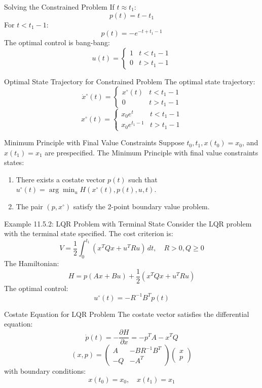 \documentclass[10pt]{beamer}
\begin{document}
\begin{frame}[fragile]{Solving the Constrained Problem}
  If \( t \approx t_1 \):
  \[
  p(t) = t - t_1
  \]
  For \( t < t_1 - 1 \):
  \[
  p(t) = -e^{-t + t_1 - 1}
  \]
  The optimal control is bang-bang:
  \[
  u(t) = \begin{cases}
  1 & t < t_1 - 1 \\
  0 & t > t_1 - 1
  \end{cases}
  \]
\end{frame}
  
\begin{frame}[fragile]{Optimal State Trajectory for Constrained Problem}
  The optimal state trajectory:
  \[
  \dot{x}^\circ(t) = \begin{cases}
  x^\circ(t) & t < t_1 - 1 \\
  0 & t > t_1 - 1
  \end{cases}
  \]
  \[
  x^\circ(t) = \begin{cases}
  x_0 e^t & t < t_1 - 1 \\
  x_0 e^{t_1 - 1} & t > t_1 - 1
  \end{cases}
  \]
\end{frame}
  
\begin{frame}[fragile]{Minimum Principle with Final Value Constraints}
  Suppose \( t_0, t_1, x(t_0) = x_0 \), and \( x(t_1) = x_1 \) are prespecified. The Minimum Principle with final value constraints states:
  \begin{enumerate}
      \item There exists a costate vector \( p(t) \) such that \( u^\circ(t) = \arg \min_u H(x^\circ(t), p(t), u, t) \).
      \item The pair \( (p, x^\circ) \) satisfy the 2-point boundary value problem.
  \end{enumerate}
\end{frame}
  
\begin{frame}[fragile]{Example 11.5.2: LQR Problem with Terminal State}
  Consider the LQR problem with the terminal state specified. The cost criterion is:
  \[
  V = \frac{1}{2} \int_0^{t_1} (x^T Q x + u^T R u) \, dt, \quad R > 0, Q \ge 0
  \]
  The Hamiltonian:
  \[
  H = p (A x + B u) + \frac{1}{2} (x^T Q x + u^T R u)
  \]
  The optimal control:
  \[
  u^\circ(t) = -R^{-1} B^T p(t)
  \]
\end{frame}
  
\begin{frame}[fragile]{Costate Equation for LQR Problem}
  The costate vector satisfies the differential equation:
  \[
  \dot{p}(t) = -\frac{\partial H}{\partial x} = -p^T A - x^T Q
  \]
  \[
  (x, p) = \begin{pmatrix}
  A & -BR^{-1}B^T \\
  -Q & -A^T
  \end{pmatrix} \begin{pmatrix}
  x \\
  p
  \end{pmatrix}
  \]
  with boundary conditions:
  \[
  x(t_0) = x_0, \quad x(t_1) = x_1
  \]
\end{frame}
  
\end{document}
